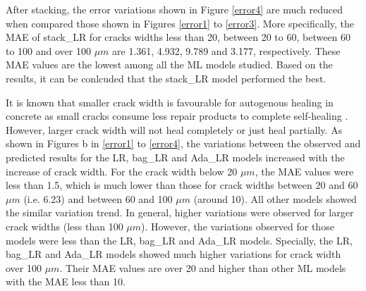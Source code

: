\documentclass[11pt]{article}
\begin{document}
    After stacking, the error variations shown in Figure \ref{error4} are much reduced when compared those shown in Figures \ref{error1} to \ref{error3}. More specifically, the MAE of stack\_LR for cracks widths less than 20, between 20 to 60, between 60 to 100 and over 100 $\mu m$ are 1.361, 4.932, 9.789 and 3.177, respectively. These MAE values are the lowest among all the ML models studied. Based on the results, it can be conlcuded that the stack\_LR model performed the best. 
    
    
    It is known that smaller crack width is favourable for autogenous healing in concrete \cite{herbert2013selfhealing,liu2017influence} as small cracks consume less repair products to complete self-healing \cite{de2018review}. However, larger crack width will not heal completely or just heal partially. As shown in Figures b in \ref{error1} to \ref{error4}, the variations between the observed and predicted results for the LR, bag\_LR and Ada\_LR models increased with the increase of crack width. For the crack width below 20 $\mu m$, the MAE values were less than 1.5, which is much lower than those for crack widths between 20 and 60 $\mu m$ (i.e. 6.23) and between 60 and 100 $\mu m$ (around 10). All other models showed the similar variation trend. In general, higher variations were observed for larger crack widths (less than 100 $\mu m$). However, the variations observed for those models were less than the LR, bag\_LR and Ada\_LR models. Specially, the LR, bag\_LR and Ada\_LR models showed much higher variations for crack width over 100 $\mu m$. Their MAE values are over 20 and higher than other ML models with the MAE less than 10. 
    

	
	
	
\end{document}
